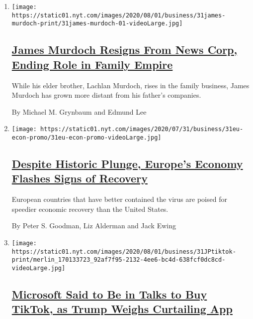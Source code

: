 \begin{enumerate}
\def\labelenumi{\arabic{enumi}.}
\item
  \texttt{[image: https://static01.nyt.com/images/2020/08/01/business/31james-murdoch-print/31james-murdoch-01-videoLarge.jpg]}

  \hypertarget{james-murdoch-resigns-from-news-corp-ending-role-in-family-empire}{%
  \subsection{\texorpdfstring{\href{/2020/07/31/business/media/james-murdoch-resigns-news-corp.html}{James
  Murdoch Resigns From News Corp, Ending Role in Family
  Empire}}{James Murdoch Resigns From News Corp, Ending Role in Family Empire}}\label{james-murdoch-resigns-from-news-corp-ending-role-in-family-empire}}

  While his elder brother, Lachlan Murdoch, rises in the family
  business, James Murdoch has grown more distant from his father's
  companies.

  By Michael M. Grynbaum and Edmund Lee
\item
  \texttt{[image: https://static01.nyt.com/images/2020/07/31/business/31eu-econ-promo/31eu-econ-promo-videoLarge.jpg]}

  \hypertarget{despite-historic-plunge-europes-economy-flashes-signs-of-recovery}{%
  \subsection{\texorpdfstring{\href{/2020/07/31/business/europe-economy-recovery-coronavirus.html}{Despite
  Historic Plunge, Europe's Economy Flashes Signs of
  Recovery}}{Despite Historic Plunge, Europe's Economy Flashes Signs of Recovery}}\label{despite-historic-plunge-europes-economy-flashes-signs-of-recovery}}

  European countries that have better contained the virus are poised for
  speedier economic recovery than the United States.

  By Peter S. Goodman, Liz Alderman and Jack Ewing
\item
  \texttt{[image: https://static01.nyt.com/images/2020/08/01/business/31JPtiktok-print/merlin\_170133723\_92af7f95-2132-4ee6-bc4d-638fcf0dc8cd-videoLarge.jpg]}

  \hypertarget{microsoft-said-to-be-in-talks-to-buy-tiktok-as-trump-weighs-curtailing-app}{%
  \subsection{\texorpdfstring{\href{/2020/07/31/technology/tiktok-microsoft.html}{Microsoft
  Said to Be in Talks to Buy TikTok, as Trump Weighs Curtailing
  App}}{Microsoft Said to Be in Talks to Buy TikTok, as Trump Weighs Curtailing App}}\label{microsoft-said-to-be-in-talks-to-buy-tiktok-as-trump-weighs-curtailing-app}}


\end{enumerate}
